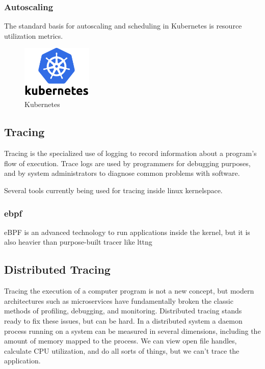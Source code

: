 \documentclass[conference]{IEEEtran}
\begin{document}
\subsubsection{Autoscaling}
The standard basis for autoscaling and scheduling in Kubernetes is resource utilization metrics.
\begin{figure}
    \begin{center}
        \includegraphics[width=0.3\textwidth]{figures/kubernetes.png}
    \end{center}
    \caption{Kubernetes}
    \label{fig:Kubernetes}
\end{figure}

\subsection{Tracing}

Tracing is the specialized use of logging to record information about a program’s flow of execution.
Trace logs are used by programmers for debugging purposes, and by system administrators to diagnose common problems with software.

Several tools currently being used for tracing inside linux kernelspace. 

\subsubsection{ebpf}

eBPF is an advanced technology to run applications inside the kernel, but it is also heavier than purpose-built tracer like lttng

\subsection{Distributed Tracing}
                                                                                                                     Tracing the execution of a computer program is not a new concept, but modern architectures such as microservices have fundamentally broken the classic methods of profiling, debugging, and monitoring. Distributed tracing stands ready to fix these issues, but can be hard.
                                                                                                                     In a distributed system a daemon process running on a system can be measured in several dimensions, including the amount of memory mapped to the process. We can view open file handles, calculate CPU utilization, and do all sorts of things, but we can't trace the application.
\end{document}
